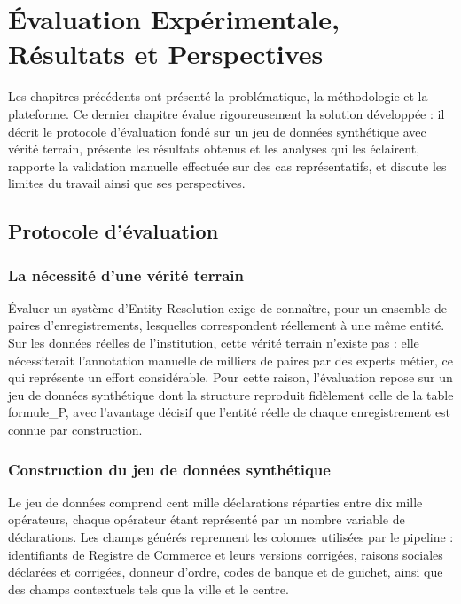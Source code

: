 \chapter{Évaluation Expérimentale, Résultats et Perspectives}

Les chapitres précédents ont présenté la problématique, la méthodologie et la plateforme. Ce dernier chapitre évalue rigoureusement la solution développée : il décrit le protocole d'évaluation fondé sur un jeu de données synthétique avec vérité terrain, présente les résultats obtenus et les analyses qui les éclairent, rapporte la validation manuelle effectuée sur des cas représentatifs, et discute les limites du travail ainsi que ses perspectives.

\section{Protocole d'évaluation}

\subsection{La nécessité d'une vérité terrain}

Évaluer un système d'Entity Resolution exige de connaître, pour un ensemble de paires d'enregistrements, lesquelles correspondent réellement à une même entité. Sur les données réelles de l'institution, cette vérité terrain n'existe pas : elle nécessiterait l'annotation manuelle de milliers de paires par des experts métier, ce qui représente un effort considérable. Pour cette raison, l'évaluation repose sur un jeu de données synthétique dont la structure reproduit fidèlement celle de la table formule\_P, avec l'avantage décisif que l'entité réelle de chaque enregistrement est connue par construction.

\subsection{Construction du jeu de données synthétique}

Le jeu de données comprend cent mille déclarations réparties entre dix mille opérateurs, chaque opérateur étant représenté par un nombre variable de déclarations. Les champs générés reprennent les colonnes utilisées par le pipeline : identifiants de Registre de Commerce et leurs versions corrigées, raisons sociales déclarées et corrigées, donneur d'ordre, codes de banque et de guichet, ainsi que des champs contextuels tels que la ville et le centre.

